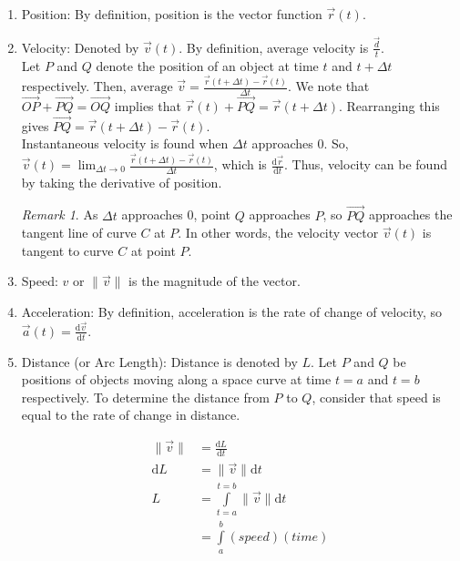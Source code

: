 \documentclass[11pt]{article}
\theoremstyle{plain} %
\theoremstyle{definition}
\theoremstyle{example}
\theoremstyle{remark}
\newtheorem*{remark}{Remark}
\begin{document}
\begin{enumerate}
	\item Position: By definition, position is the vector function $\vec{r}(t)$. 
	\item Velocity: Denoted by $\vec{v}(t)$. By definition, average velocity is $\frac{\vec{d}}{t}$. \\
	
	
		
	Let $P$ and $Q$ denote the position of an object at time $t$ and $t + \Delta t$ respectively. Then, $\text{average } \vec{v} = \frac{\vec{r}(t + \Delta t) - \vec{r}(t)}{\Delta t}$. We note that $\overrightarrow{OP}  + \overrightarrow{PQ} = \overrightarrow{OQ}$ implies that $\vec{r}(t) + \overrightarrow{PQ} = \vec{r}(t + \Delta t)$. Rearranging this gives $\overrightarrow{PQ} = \vec{r}(t + \Delta t) - \vec{r}(t)$.\\
	
	
 Instantaneous velocity is found when $\Delta t$ approaches 0. So, $\vec{v}(t) = \lim_{\Delta t  \to 0} \frac{\vec{r}(t + \Delta t) - \vec{r}(t)}{\Delta t}$, which is $\frac{\mathrm d \vec{r}}{\mathrm d t}$. Thus, velocity can be found by taking the derivative of position.
 
 \begin{remark}
 As $\Delta t$ approaches 0, point $Q$ approaches $P$, so $\overrightarrow{PQ}$ approaches the tangent line of curve $C$ at $P$. In other words, the velocity vector $\vec{v}(t)$ is tangent to curve $C$ at point $P$.
 \end{remark}
 
 	\item Speed: $v$ or $\|\vec{v}\|$ is the magnitude of the vector.
 	\item Acceleration: By definition, acceleration is the rate of change of velocity, so $\vec{a}(t) = \frac{\mathrm d \vec{v}}{\mathrm d t}$.
	\item Distance (or Arc Length): Distance is denoted by $L$. Let $P$ and $Q$ be positions of objects moving along a space curve at time $t=a$ and $t=b$ respectively. To determine the distance from $P$ to $Q$, consider that speed is equal to the rate of change in distance. 
	
\begin{align*}
	\|\vec{v}\| &= \frac{\mathrm d L}{\mathrm d t}\\
	\mathrm d L &= \|\vec{v}\| \mathrm d t\\
	L &= \int\limits_{t=a}^{t=b}\|\vec{v}\| \mathrm d t\\
	&= \int\limits_{a}^{b}(speed)(time)
\end{align*}
	
\end{enumerate}
\end{document}
